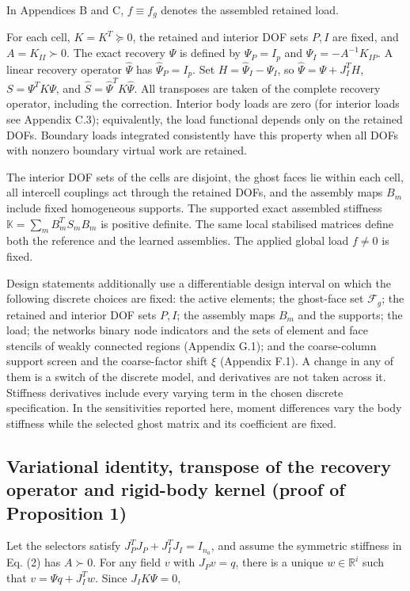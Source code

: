 \documentclass[preprint,12pt,authoryear]{elsarticle}
\begin{document}
In Appendices B and C, \(f\equiv f_g\) denotes the assembled retained load.

For each cell, \(K=K^T\succeq0\), the retained and interior DOF sets \(P,I\) are fixed, and \(A=K_{II}\succ0\). The exact recovery \(\Psi\) is defined by \(\Psi_P=I_p\) and \(\Psi_I=-A^{-1}K_{IP}\). A linear recovery operator \(\widehat\Psi\) has \(\widehat\Psi_P=I_p\). Set \(H=\widehat\Psi_I-\Psi_I\), so \(\widehat\Psi=\Psi+J_I^TH\), \(S=\Psi^TK\Psi\), and \(\widehat S=\widehat\Psi^TK\widehat\Psi\). All transposes are taken of the complete recovery operator, including the correction. Interior body loads are zero (for interior loads see Appendix C.3); equivalently, the load functional depends only on the retained DOFs. Boundary loads integrated consistently have this property when all DOFs with nonzero boundary virtual work are retained.

The interior DOF sets of the cells are disjoint, the ghost faces lie within each cell, all intercell couplings act through the retained DOFs, and the assembly maps \(B_m\) include fixed homogeneous supports. The supported exact assembled stiffness \(\mathbb K=\sum_m B_m^TS_mB_m\) is positive definite. The same local stabilised matrices define both the reference and the learned assemblies. The applied global load \(f\ne0\) is fixed.

Design statements additionally use a differentiable design interval on which the following discrete choices are fixed: the active elements; the ghost-face set \(\mathcal F_g\); the retained and interior DOF sets \(P,I\); the assembly maps \(B_m\) and the supports; the load; the network\textquotesingle s binary node indicators and the sets of element and face stencils of weakly connected regions (Appendix G.1); and the coarse-column support screen and the coarse-factor shift \(\xi\) (Appendix F.1). A change in any of them is a switch of the discrete model, and derivatives are not taken across it. Stiffness derivatives include every varying term in the chosen discrete specification. In the sensitivities reported here, moment differences vary the body stiffness while the selected ghost matrix and its coefficient are fixed.

\subsection{Variational identity, transpose of the recovery operator and rigid-body kernel (proof of Proposition 1)}

Let the selectors satisfy \(J_P^TJ_P+J_I^TJ_I=I_{n_a}\), and assume the symmetric stiffness in Eq. (2) has \(A\succ0\). For any field \(v\) with \(J_Pv=q\), there is a unique \(w\in\mathbb R^i\) such that \(v=\Psi q+J_I^Tw\). Since \(J_IK\Psi=0\),
\end{document}
